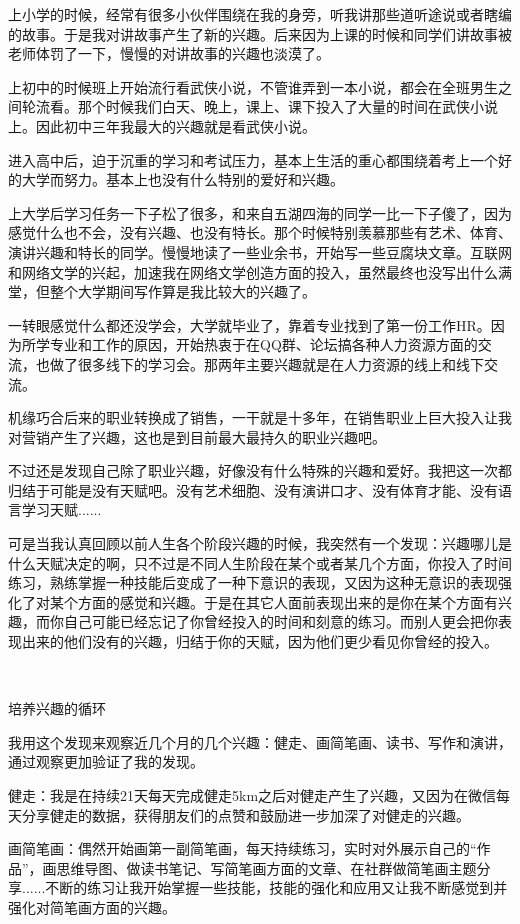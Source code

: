 \documentclass[11pt,a4paper]{article}
\begin{document}
上小学的时候，经常有很多小伙伴围绕在我的身旁，听我讲那些道听途说或者瞎编的故事。于是我对讲故事产生了新的兴趣。后来因为上课的时候和同学们讲故事被老师体罚了一下，慢慢的对讲故事的兴趣也淡漠了。﻿﻿

上初中的时候班上开始流行看武侠小说，不管谁弄到一本小说，都会在全班男生之间轮流看。那个时候我们白天、晚上，课上、课下投入了大量的时间在武侠小说上。因此初中三年我最大的兴趣就是看武侠小说。﻿﻿

进入高中后，迫于沉重的学习和考试压力，基本上生活的重心都围绕着考上一个好的大学而努力。基本上也没有什么特别的爱好和兴趣。﻿﻿

上大学后学习任务一下子松了很多，和来自五湖四海的同学一比一下子傻了，因为感觉什么也不会，没有兴趣、也没有特长。那个时候特别羡慕那些有艺术、体育、演讲兴趣和特长的同学。慢慢地读了一些业余书，开始写一些豆腐块文章。互联网和网络文学的兴起，加速我在网络文学创造方面的投入，虽然最终也没写出什么满堂，但整个大学期间写作算是我比较大的兴趣了。﻿﻿

一转眼感觉什么都还没学会，大学就毕业了，靠着专业找到了第一份工作HR。因为所学专业和工作的原因，开始热衷于在QQ群、论坛搞各种人力资源方面的交流，也做了很多线下的学习会。那两年主要兴趣就是在人力资源的线上和线下交流。﻿﻿

机缘巧合后来的职业转换成了销售，一干就是十多年，在销售职业上巨大投入让我对营销产生了兴趣，这也是到目前最大最持久的职业兴趣吧。﻿﻿

不过还是发现自己除了职业兴趣，好像没有什么特殊的兴趣和爱好。我把这一次都归结于可能是没有天赋吧。没有艺术细胞、没有演讲口才、没有体育才能、没有语言学习天赋......﻿﻿

可是当我认真回顾以前人生各个阶段兴趣的时候，我突然有一个发现：兴趣哪儿是什么天赋决定的啊，只不过是不同人生阶段在某个或者某几个方面，你投入了时间练习，熟练掌握一种技能后变成了一种下意识的表现，又因为这种无意识的表现强化了对某个方面的感觉和兴趣。于是在其它人面前表现出来的是你在某个方面有兴趣，而你自己可能已经忘记了你曾经投入的时间和刻意的练习。而别人更会把你表现出来的他们没有的兴趣，归结于你的天赋，因为他们更少看见你曾经的投入。﻿﻿

﻿

培养兴趣的循环

我用这个发现来观察近几个月的几个兴趣：健走、画简笔画、读书、写作和演讲，通过观察更加验证了我的发现。﻿﻿

健走：我是在持续21天每天完成健走5km之后对健走产生了兴趣，又因为在微信每天分享健走的数据，获得朋友们的点赞和鼓励进一步加深了对健走的兴趣。﻿﻿

画简笔画：偶然开始画第一副简笔画，每天持续练习，实时对外展示自己的“作品”，画思维导图、做读书笔记、写简笔画方面的文章、在社群做简笔画主题分享......不断的练习让我开始掌握一些技能，技能的强化和应用又让我不断感觉到并强化对简笔画方面的兴趣。﻿﻿
\end{document}
